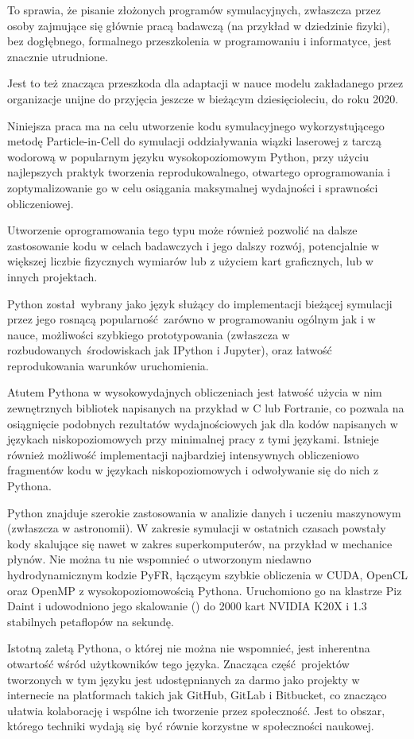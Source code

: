 To sprawia, że pisanie złożonych programów symulacyjnych, zwłaszcza przez osoby
zajmujące się głównie pracą badawczą (na przykład w dziedzinie fizyki), bez dogłębnego, formalnego przeszkolenia
w programowaniu i informatyce, jest znacznie utrudnione.

Jest to też znacząca przeszkoda dla adaptacji
w nauce modelu  zakładanego przez organizacje unijne
do przyjęcia jeszcze w bieżącym dziesięcioleciu, do roku 2020.

Niniejsza praca ma na celu utworzenie kodu symulacyjnego wykorzystującego metodę Particle-in-Cell
do symulacji oddziaływania wiązki laserowej z tarczą wodorową w popularnym języku
wysokopoziomowym Python, przy użyciu najlepszych praktyk tworzenia reprodukowalnego, otwartego oprogramowania
i zoptymalizowanie go w celu osiągania maksymalnej wydajności i sprawności obliczeniowej.

Utworzenie oprogramowania tego typu może również pozwolić na dalsze
zastosowanie kodu w celach badawczych i jego dalszy rozwój, potencjalnie w
większej liczbie fizycznych wymiarów lub z użyciem kart graficznych, lub w
innych projektach.

Python został wybrany jako język służący do implementacji bieżącej symulacji
przez jego rosnącą popularność zarówno w programowaniu ogólnym jak i w nauce,
możliwości szybkiego prototypowania (zwłaszcza w rozbudowanych środowiskach jak
IPython\cite{ipython} i Jupyter\cite{jupyter}), oraz łatwość reprodukowania
warunków uruchomienia.

Atutem Pythona w wysokowydajnych obliczeniach jest łatwość użycia w nim
zewnętrznych bibliotek napisanych na przykład w C lub Fortranie, co pozwala na
osiągnięcie podobnych rezultatów wydajnościowych jak dla kodów napisanych w
językach niskopoziomowych przy minimalnej pracy z tymi językami. Istnieje
również możliwość implementacji najbardziej intensywnych obliczeniowo
fragmentów kodu w językach niskopoziomowych i odwoływanie się do nich z
Pythona.

Python znajduje szerokie zastosowania w analizie danych i uczeniu maszynowym
(zwłaszcza w astronomii\cite{astropy}). W zakresie symulacji w ostatnich czasach powstały
kody skalujące się nawet w zakres superkomputerów, na przykład w mechanice
płynów.  Nie można tu nie wspomnieć o utworzonym niedawno hydrodynamicznym kodzie
PyFR, łączącym szybkie obliczenia w CUDA, OpenCL oraz OpenMP z wysokopoziomowością Pythona. Uruchomiono go na klastrze Piz Daint
i udowodniono jego skalowanie () do 2000 kart NVIDIA K20X i 1.3 stabilnych petaflopów na sekundę.~\cite{pyfr}~\cite{pyfr-euroscipy}

Istotną zaletą Pythona, o której nie można nie wspomnieć, jest inherentna
otwartość wśród użytkowników tego języka. Znacząca część projektów tworzonych w
tym języku jest udostępnianych za darmo jako projekty  w
internecie na platformach takich jak GitHub, GitLab i Bitbucket, co znacząco
ułatwia kolaborację i wspólne ich tworzenie przez społeczność.  Jest to obszar,
którego techniki wydają się być równie korzystne w społeczności naukowej.

